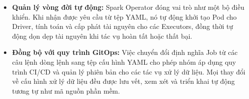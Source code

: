 \begin{itemize} 
    \item \textbf{Quản lý vòng đời tự động:} Spark Operator đóng vai trò như một bộ điều khiển. Khi nhận được yêu cầu từ tệp YAML, nó tự động khởi tạo Pod cho Driver, tính toán và cấp phát tài nguyên cho các Executors, đồng thời tự động dọn dẹp tài nguyên khi tác vụ hoàn tất hoặc thất bại.

    \item \textbf{Đồng bộ với quy trình GitOps:} Việc chuyển đổi định nghĩa Job từ các câu lệnh dòng lệnh sang tệp cấu hình YAML cho phép nhóm áp dụng quy trình CI/CD và quản lý phiên bản cho các tác vụ xử lý dữ liệu. Mọi thay đổi về cấu hình xử lý dữ liệu đều được lưu vết, xem xét và triển khai tự động tương tự như mã nguồn phần mềm.
\end{itemize}